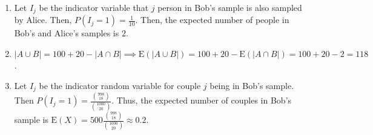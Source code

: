 \begin{enumerate}[label=(\alph*)]
\item Let $I_{j}$ be the indicator variable that $j$ person in Bob's sample is
also sampled by Alice. Then, $P(I_{j}=1) = \frac{1}{10}$. Then, the expected
number of people in Bob's and Alice's samples is $2$.

\item $|A \cup B| = 100 + 20 - |A \cap B| \implies \text{E}(|A \cup B|) =
100 + 20 - \text{E}(|A \cap B|) = 100 + 20 - 2 = 118$.

\item Let $I_{j}$ be the indicator random variable for couple $j$ being in Bob's
sample. Then $P(I_{j}=1) = \frac{\binom{998}{18}}{\binom{1000}{20}}$. Thus, the
expected number of couples in Bob's sample is $\text{E}(X) = 500\frac{
\binom{998}{18}}{\binom{1000}{20}} \approx 0.2$.
\end{enumerate}